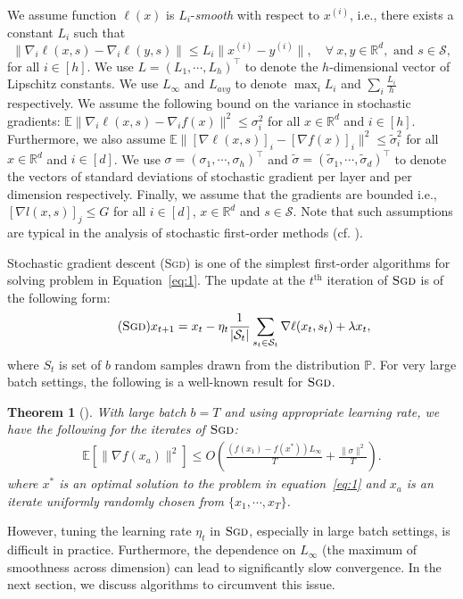 \documentclass{article} \usepackage{iclr2020_conference,times}
\def\eqref#1{equation~\ref{#1}}
\newtheorem{theorem}{Theorem}
\newcommand{\sgd}{\textsc{Sgd}\xspace}
\newcommand{\reals}{\mathbb{R}}
\begin{document}
We assume function $\ell(x)$ is $L_i$-\emph{smooth} with respect to $x^{(i)}$, i.e.,  there exists a constant $L_i$ such that
\begin{equation}
\label{eq:l-const}
  \|\nabla_i \ell(x, s)-\nabla_i \ell(y, s)\| \le L_i\|x^{(i)}-y^{(i)}\|,\quad\forall\ x, y \in \reals^d, \text{ and  } s \in \mathcal{S},
\end{equation}
for all $i \in [h]$. We use $L = (L_1, \cdots, L_h)^\top$ to denote the $h$-dimensional vector of Lipschitz constants. 
We use $L_\infty$ and $L_{avg}$ to denote $\max_i L_i$ and $\sum_i \tfrac{L_i}{h}$ respectively.  We assume the following bound on the variance in stochastic gradients: $\mathbb{E}\|\nabla_i \ell(x, s) - \nabla_i f(x)\|^2 \leq \sigma_i^2$ for all $x \in \mathbb{R}^d$ and $i \in [h]$.    
Furthermore, we also assume $\mathbb{E}\|[\nabla \ell(x, s)]_i - [\nabla f(x)]_i\|^2 \leq \tilde{\sigma}_i^2$ for all $x \in \mathbb{R}^d$ and $i \in [d]$.  
We use $\sigma = (\sigma_1, \cdots, \sigma_h)^\top$ and $\tilde{\sigma} = (\tilde{\sigma}_1, \cdots, \tilde{\sigma}_d)^\top$ to denote the vectors of standard deviations of stochastic gradient per layer and per dimension respectively.  
Finally, we assume that the gradients are bounded i.e., $[\nabla l(x,s)]_j \leq G$ for all $i \in [d]$, $x \in \mathbb{R}^d$ and $s \in \mathcal{S}$. 
Note that such assumptions are typical in the analysis of stochastic first-order methods (cf. \citep{Ghadimi13,Ghadimi14}). 

Stochastic gradient descent (\sgd) is one of the simplest first-order algorithms for solving problem in Equation~\ref{eq:1}. The update at the $t^{\text{th}}$ iteration of $\sgd$ is of the following form:
\begin{equation}
\tag{$\sgd$}
x_{t+1} = x_{t} - \eta_t  \frac{1}{|\mathcal{S}_t|} \sum_{s_t \in \mathcal{S}_t} \nabla \ell(x_t, s_t) + \lambda x_t,
\end{equation}
where $S_t$ is set of $b$ random samples drawn from the  distribution $\mathbb{P}$. For very large batch settings, the following is a well-known result for $\sgd$.
\begin{theorem}[\citep{ghadimi2013stochastic}]
With large batch $b=T$ and using appropriate learning rate, we have the following for the iterates of $\sgd$:
\begin{align*}
\mathbb{E}\left[\|\nabla f(x_a)\|^2\right] \leq O\left(\frac{(f(x_1) - f(x^*))L_{\infty}}{T} + \frac{\|\sigma \|^2}{T}\right).
\end{align*}
where $x^*$ is an optimal solution to the problem in \eqref{eq:1} and $x_a$ is an iterate uniformly randomly chosen from $\{x_1, \cdots, x_T\}$.
\label{thm:sgd-conv}
\end{theorem}
However, tuning the learning rate $\eta_t$ in $\sgd$, especially in large batch settings, is difficult in practice. Furthermore, the dependence on $L_\infty$ (the maximum of smoothness across dimension) can lead to significantly slow convergence. In the next section, we discuss algorithms to circumvent this issue.  
\end{document}
